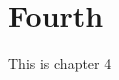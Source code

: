 \documentclass[../main]{subfiles}
\begin{document}
\chapter{Fourth}
\label{chap:fourth}

This is chapter 4
\end{document}
